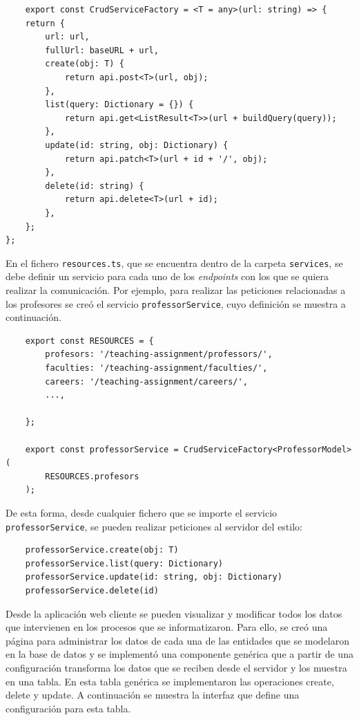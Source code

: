 \begin{verbatim}
    export const CrudServiceFactory = <T = any>(url: string) => {
    return {
        url: url,
        fullUrl: baseURL + url,
        create(obj: T) {
            return api.post<T>(url, obj);
        },
        list(query: Dictionary = {}) {
            return api.get<ListResult<T>>(url + buildQuery(query));
        },
        update(id: string, obj: Dictionary) {
            return api.patch<T>(url + id + '/', obj);
        },
        delete(id: string) {
            return api.delete<T>(url + id);
        },
    };
};
\end{verbatim}


En el fichero \texttt{resources.ts}, que se encuentra dentro de la carpeta \texttt{services},
se debe definir un servicio para cada uno de los \textit{endpoints}  
con los que se quiera realizar la comunicación. Por ejemplo,
para realizar las peticiones relacionadas a los profesores se 
creó el servicio \texttt{professorService}, cuyo definición se muestra a continuación.

\begin{verbatim}
    export const RESOURCES = {
        profesors: '/teaching-assignment/professors/',
        faculties: '/teaching-assignment/faculties/',
        careers: '/teaching-assignment/careers/',
        ...,

    };

    export const professorService = CrudServiceFactory<ProfessorModel>(
        RESOURCES.profesors
    );
\end{verbatim}


De esta forma, desde cualquier fichero que se importe el servicio \texttt{professorService},
se pueden realizar peticiones al servidor del estilo:

\begin{verbatim}
    professorService.create(obj: T)
    professorService.list(query: Dictionary)
    professorService.update(id: string, obj: Dictionary)
    professorService.delete(id)
\end{verbatim}


Desde la aplicación web cliente se pueden visualizar y modificar todos los 
datos que intervienen en los procesos que se informatizaron.
Para ello, se creó una página para administrar los 
datos de cada una de las entidades que se modelaron en la base de datos y
se implementó una componente genérica que a partir de una configuración
transforma los datos que se reciben desde el servidor y los muestra en una tabla.
En esta tabla genérica se implementaron las operaciones create, delete y update. 
A continuación se muestra la interfaz que define una configuración para esta  
tabla.

